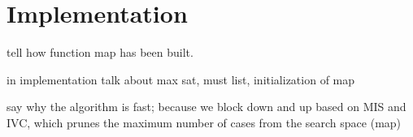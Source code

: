 \section{Implementation}
\label{sec:impl}

tell how function map has been built.

in implementation talk about max sat, must list, initialization of map

say why the algorithm is fast; because we block down and up based on MIS and IVC, which prunes the maximum number of cases from the search space (map)

%
%
%
%
